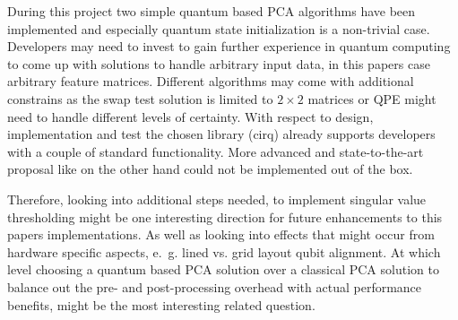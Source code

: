 During this project two simple quantum based PCA algorithms have been implemented and especially quantum state initialization is a non-trivial case. Developers may need to invest to gain further experience in quantum computing to come up with solutions to handle arbitrary input data, in this papers case arbitrary feature matrices. Different algorithms may come with additional constrains as the swap test solution is limited to $2 \times 2$ matrices or QPE might need to handle different levels of certainty. With respect to design, implementation and test the chosen library (cirq) already supports developers with a couple of standard functionality. More advanced and state-to-the-art proposal like \cite{He_2021} on the other hand could not be implemented out of the box.

Therefore, looking into additional steps needed, to implement singular value thresholding might be one interesting direction for future enhancements to this papers implementations. As well as looking into effects that might occur from hardware specific aspects, e.~g. lined vs. grid layout qubit alignment. At which level choosing a quantum based PCA solution over a classical PCA solution to balance out the pre- and post-processing overhead with actual performance benefits, might be the most interesting related question.

